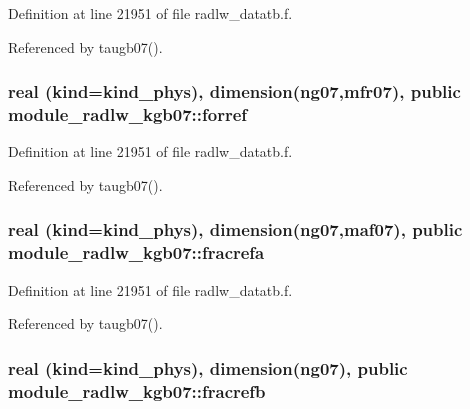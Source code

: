 Definition at line 21951 of file radlw\+\_\+datatb.\+f.



Referenced by taugb07().

\subsubsection[{\texorpdfstring{forref}{forref}}]{\setlength{\rightskip}{0pt plus 5cm}real (kind=kind\+\_\+phys), dimension(ng07,{\bf mfr07}), public module\+\_\+radlw\+\_\+kgb07\+::forref}\hypertarget{namespacemodule__radlw__kgb07_a43ceef4cb2707a2874c2d59e93ba9791}{}\label{namespacemodule__radlw__kgb07_a43ceef4cb2707a2874c2d59e93ba9791}


Definition at line 21951 of file radlw\+\_\+datatb.\+f.



Referenced by taugb07().

\subsubsection[{\texorpdfstring{fracrefa}{fracrefa}}]{\setlength{\rightskip}{0pt plus 5cm}real (kind=kind\+\_\+phys), dimension(ng07,{\bf maf07}), public module\+\_\+radlw\+\_\+kgb07\+::fracrefa}\hypertarget{namespacemodule__radlw__kgb07_a07f2a4a0f1152a65aed68623f14a9ae4}{}\label{namespacemodule__radlw__kgb07_a07f2a4a0f1152a65aed68623f14a9ae4}


Definition at line 21951 of file radlw\+\_\+datatb.\+f.



Referenced by taugb07().

\subsubsection[{\texorpdfstring{fracrefb}{fracrefb}}]{\setlength{\rightskip}{0pt plus 5cm}real (kind=kind\+\_\+phys), dimension(ng07), public module\+\_\+radlw\+\_\+kgb07\+::fracrefb}\hypertarget{namespacemodule__radlw__kgb07_aa16eb60406e5a298e380b55af528791a}{}\label{namespacemodule__radlw__kgb07_aa16eb60406e5a298e380b55af528791a}



